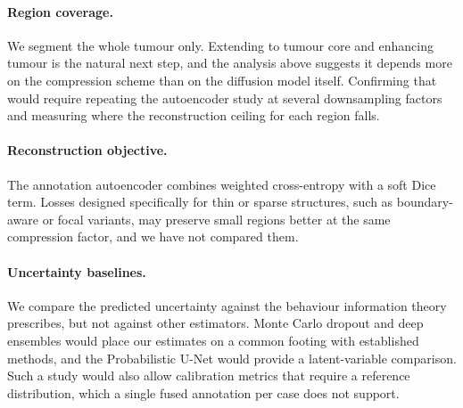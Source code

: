 \paragraph{Region coverage.}
We segment the whole tumour only. Extending to tumour core and enhancing
tumour is the natural next step, and the analysis above suggests it depends
more on the compression scheme than on the diffusion model itself. Confirming
that would require repeating the autoencoder study at several downsampling
factors and measuring where the reconstruction ceiling for each region falls.

\paragraph{Reconstruction objective.}
The annotation autoencoder combines weighted cross-entropy with a soft Dice
term. Losses designed specifically for thin or sparse structures, such as
boundary-aware or focal variants, may preserve small regions better at the
same compression factor, and we have not compared them.

\paragraph{Uncertainty baselines.}
We compare the predicted uncertainty against the behaviour information theory
prescribes, but not against other estimators. Monte Carlo dropout and deep
ensembles would place our estimates on a common footing with established
methods, and the Probabilistic U-Net would provide a latent-variable
comparison. Such a study would also allow calibration metrics that require a
reference distribution, which a single fused annotation per case does not
support.
